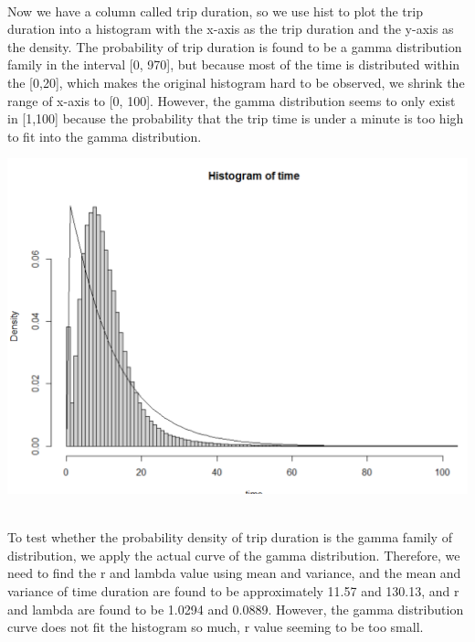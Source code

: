 \documentclass[11pt]{article}
\begin{document}
\\
\par
Now we have a column called trip duration, so we use hist to plot the trip duration into a histogram with the x-axis
 as the trip duration and the y-axis as the density. The probability of trip duration is found to be a gamma
 distribution family in the interval [0, 970], but because most of the time is distributed within the [0,20],
 which makes the original histogram hard to be observed, we shrink the range of x-axis to [0, 100]. However,
 the gamma distribution seems to only exist in [1,100] because the probability that the trip time is under a minute
 is too high to fit into the gamma distribution.

\includegraphics[scale = .5]{hist_p1_1.png}\\


\\
\par
To test whether the probability density of trip duration is the gamma family of distribution, we apply the actual
 curve of the gamma distribution. Therefore, we need to find the r and lambda value using mean and variance, and
 the mean and variance of time duration are found to be approximately 11.57 and 130.13, and r and lambda are found
 to be 1.0294 and 0.0889. However, the gamma distribution curve does not fit the histogram so much,  r value seeming
 to be too small. 
\end{document}

